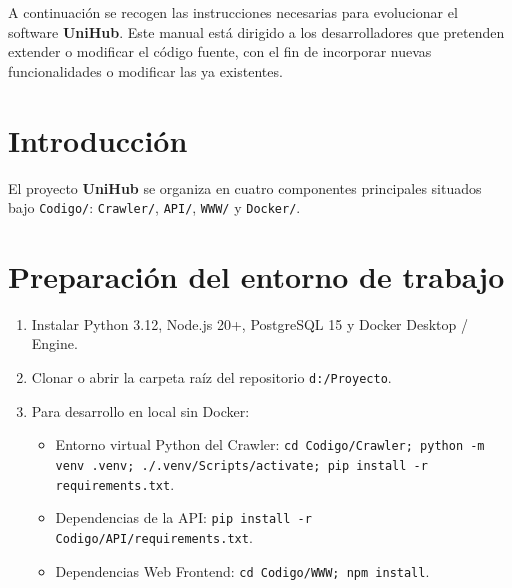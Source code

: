 A continuación se recogen las instrucciones necesarias para evolucionar el software \textbf{UniHub}. Este manual está dirigido a los desarrolladores que pretenden extender o modificar el código fuente, con el fin de incorporar nuevas funcionalidades o modificar las ya existentes.

\section{Introducción}
El proyecto \textbf{UniHub} se organiza en cuatro componentes principales situados bajo \texttt{Codigo/}: \texttt{Crawler/}, \texttt{API/}, \texttt{WWW/} y \texttt{Docker/}.

\section{Preparación del entorno de trabajo}
\begin{enumerate}
    \item Instalar Python 3.12, Node.js 20+, PostgreSQL 15 y Docker Desktop / Engine.
    \item Clonar o abrir la carpeta raíz del repositorio \texttt{d:/Proyecto}.
    \item Para desarrollo en local sin Docker:
        \begin{itemize}
            \item Entorno virtual Python del Crawler: \texttt{cd Codigo/Crawler; python -m venv .venv; ./.venv/Scripts/activate; pip install -r requirements.txt}.
            \item Dependencias de la API: \texttt{pip install -r Codigo/API/requirements.txt}.
            \item Dependencias Web Frontend: \texttt{cd Codigo/WWW; npm install}.
        \end{itemize}
\end{enumerate}

